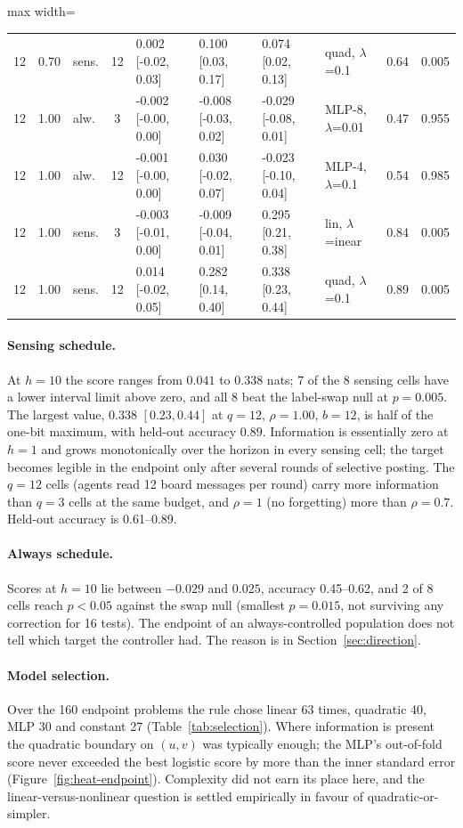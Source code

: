 \documentclass[10pt]{article}
\begin{document}
\begin{table}[htbp]
\begin{adjustbox}{max width=\textwidth}
\begin{tabular}{cclc lll l cc}
12 & 0.70 & sens. & 12 & 0.002 [-0.02, 0.03] & 0.100 [0.03, 0.17] & 0.074 [0.02, 0.13] & quad, $\lambda$=0.1 & 0.64 & 0.005 \\
12 & 1.00 & alw. & 3 & -0.002 [-0.00, 0.00] & -0.008 [-0.03, 0.02] & -0.029 [-0.08, 0.01] & MLP-8, $\lambda$=0.01 & 0.47 & 0.955 \\
12 & 1.00 & alw. & 12 & -0.001 [-0.00, 0.00] & 0.030 [-0.02, 0.07] & -0.023 [-0.10, 0.04] & MLP-4, $\lambda$=0.1 & 0.54 & 0.985 \\
12 & 1.00 & sens. & 3 & -0.003 [-0.01, 0.00] & -0.009 [-0.04, 0.01] & 0.295 [0.21, 0.38] & lin, $\lambda$=inear & 0.84 & 0.005 \\
12 & 1.00 & sens. & 12 & 0.014 [-0.02, 0.05] & 0.282 [0.14, 0.40] & 0.338 [0.23, 0.44] & quad, $\lambda$=0.1 & 0.89 & 0.005 \\
\bottomrule
\end{tabular}
\end{adjustbox}
\end{table}

\paragraph{Sensing schedule.} At $h=10$ the score ranges from $0.041$ to $0.338$ nats; 7 of the 8 sensing cells have a lower interval limit above zero, and all 8 beat the label-swap null at $p=0.005$. The largest value, $0.338$ $[0.23,0.44]$ at $q=12$, $\rho=1.00$, $b=12$, is half of the one-bit maximum, with held-out accuracy $0.89$. Information is essentially zero at $h=1$ and grows monotonically over the horizon in every sensing cell; the target becomes legible in the endpoint only after several rounds of selective posting. The $q=12$ cells (agents read 12 board messages per round) carry more information than $q=3$ cells at the same budget, and $\rho=1$ (no forgetting) more than $\rho=0.7$. Held-out accuracy is 0.61--0.89.

\paragraph{Always schedule.} Scores at $h=10$ lie between $-0.029$ and $0.025$, accuracy 0.45--0.62, and 2 of 8 cells reach $p<0.05$ against the swap null (smallest $p=0.015$, not surviving any correction for 16 tests). The endpoint of an always-controlled population does not tell which target the controller had. The reason is in Section~\ref{sec:direction}.

\paragraph{Model selection.} Over the 160 endpoint problems the rule chose linear 63 times, quadratic 40, MLP 30 and constant 27 (Table~\ref{tab:selection}). Where information is present the quadratic boundary on $(u,v)$ was typically enough; the MLP's out-of-fold score never exceeded the best logistic score by more than the inner standard error (Figure~\ref{fig:heat-endpoint}). Complexity did not earn its place here, and the linear-versus-nonlinear question is settled empirically in favour of quadratic-or-simpler.
\end{document}
